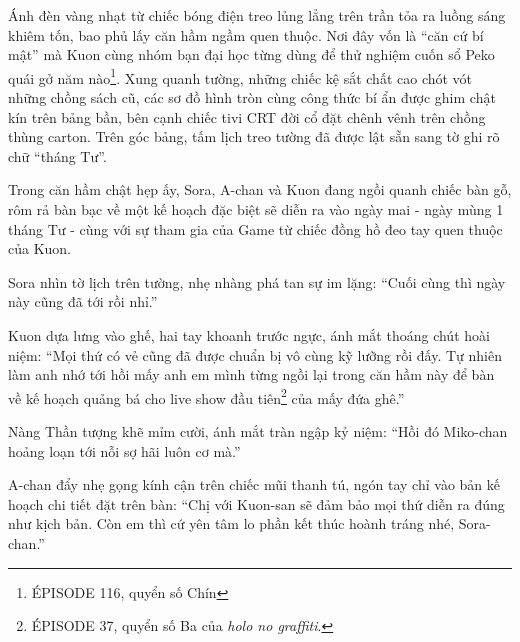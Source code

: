 \documentclass[../main.tex]{subfiles}
\begin{document}

Ánh đèn vàng nhạt từ chiếc bóng điện treo lủng lẳng trên trần tỏa ra luồng sáng khiêm tốn, bao phủ lấy căn hầm ngầm quen thuộc. Nơi đây vốn là ``căn cứ bí mật'' mà Kuon cùng nhóm bạn đại học từng dùng để thử nghiệm cuốn sổ Peko quái gở năm nào\footnote{{\flaregothic ÉPISODE 116}, quyển số Chín}. Xung quanh tường, những chiếc kệ sắt chất cao chót vót những chồng sách cũ, các sơ đồ hình tròn cùng công thức bí ẩn được ghim chật kín trên bảng bần, bên cạnh chiếc tivi CRT đời cổ đặt chênh vênh trên chồng thùng carton. Trên góc bảng, tấm lịch treo tường đã được lật sẵn sang tờ ghi rõ chữ ``tháng Tư''.

Trong căn hầm chật hẹp ấy, Sora, A-chan và Kuon đang ngồi quanh chiếc bàn gỗ, rôm rả bàn bạc về một kế hoạch đặc biệt sẽ diễn ra vào ngày mai - ngày mùng 1 tháng Tư - cùng với sự tham gia của Game từ chiếc đồng hồ đeo tay quen thuộc của Kuon.

Sora nhìn tờ lịch trên tường, nhẹ nhàng phá tan sự im lặng: ``Cuối cùng thì ngày này cũng đã tới rồi nhỉ.''

Kuon dựa lưng vào ghế, hai tay khoanh trước ngực, ánh mắt thoáng chút hoài niệm: ``Mọi thứ có vẻ cũng đã được chuẩn bị vô cùng kỹ lưỡng rồi đấy. Tự nhiên làm anh nhớ tới hồi mấy anh em mình từng ngồi lại trong căn hầm này để bàn về kế hoạch quảng bá cho live show đầu tiên\footnote{{\flaregothic ÉPISODE 37}, quyển số Ba của \textit{holo no graffiti}.} của mấy đứa ghê.''

Nàng Thần tượng khẽ mỉm cười, ánh mắt tràn ngập kỷ niệm: ``Hồi đó Miko-chan hoảng loạn tới nỗi sợ hãi luôn cơ mà.''

A-chan đẩy nhẹ gọng kính cận trên chiếc mũi thanh tú, ngón tay chỉ vào bản kế hoạch chi tiết đặt trên bàn: ``Chị với Kuon-san sẽ đảm bảo mọi thứ diễn ra đúng như kịch bản. Còn em thì cứ yên tâm lo phần kết thúc hoành tráng nhé, Sora-chan.''
\end{document}

